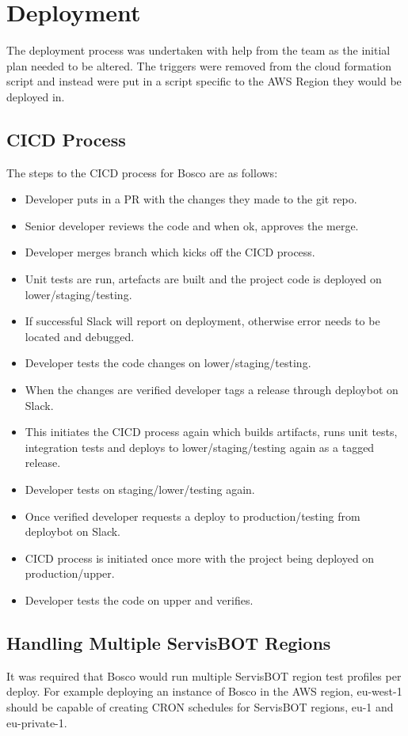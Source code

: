 \documentclass[12pt,a4paper,titlepage]{report}
\begin{document}
\chapter{Deployment}
The deployment process was undertaken with help from the team as the initial plan needed to be altered. The triggers were removed from the 
cloud formation script and instead were put in a script specific to the AWS Region they would be deployed in. 

\section{CICD Process}
The steps to the CICD process for Bosco are as follows:

\begin{itemize}
  \item Developer puts in a PR with the changes they made to the git repo.
  \item Senior developer reviews the code and when ok, approves the merge.
  \item Developer merges branch which kicks off the CICD process. 
  \item Unit tests are run, artefacts are built and the project code is deployed on lower/staging/testing.
  \item If successful Slack will report on deployment, otherwise error needs to be located and debugged. 
  \item Developer tests the code changes on lower/staging/testing.
  \item When the changes are verified developer tags a release through deploybot on Slack.
  \item This initiates the CICD process again which builds artifacts, runs unit tests, integration tests and deploys to lower/staging/testing again as a tagged release.
  \item Developer tests on staging/lower/testing again.
  \item Once verified developer requests a deploy to production/testing from deploybot on Slack.
  \item CICD process is initiated once more with the project being deployed on production/upper.
  \item Developer tests the code on upper and verifies.
\end{itemize}

\section{Handling Multiple ServisBOT Regions}
It was required that Bosco would run multiple ServisBOT region test profiles per deploy. For example deploying an instance of 
Bosco in the AWS region, eu-west-1 should be capable of creating CRON schedules for ServisBOT regions, eu-1 and eu-private-1. 
\end{document}
